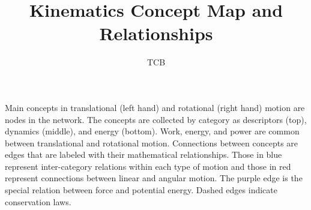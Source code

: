 \documentclass{article}
\title{Kinematics Concept Map and Relationships}
\author{TCB}
\begin{document}
\maketitle

\begin{center}

\end{center}
Main concepts in translational (left hand) and rotational (right hand)
motion are nodes in the network.  The concepts are collected by category as
descriptors (top), dynamics (middle), and energy (bottom). Work, energy,
and power are common between translational and rotational motion.
Connections between concepts are edges that are labeled with their
mathematical relationships. Those in blue represent inter-category
relations within each type of motion and those in red represent connections
between linear and angular motion.  The purple edge is the special relation
between force and potential energy. Dashed edges indicate conservation
laws. 
\end{document}
